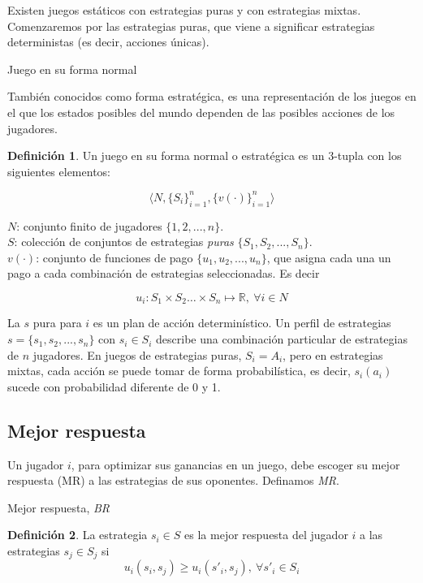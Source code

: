 \documentclass[12pt]{scrartcl}
\theoremstyle{definition}
\newtheorem{defi}{Definición}[section]
\begin{document}
Existen juegos estáticos con estrategias puras y con estrategias mixtas. Comenzaremos por las estrategias puras, que viene a significar estrategias deterministas (es decir, acciones únicas).

\begin{mybox}{Juego en su forma normal}

También conocidos como forma estratégica, es una representación de los juegos en el que los estados posibles del mundo dependen de las posibles acciones de los jugadores.

	\begin{defi}
		Un juego en su forma normal o estratégica es un 3-tupla con los siguientes elementos:
		
		\[ \big\langle N, \{S_i\}_{i=1}^n, \{v(\cdot)\}_{i=1}^n \big\rangle\]
		
		$N$: conjunto finito de jugadores $\{1, 2, ..., n\}$.\\
		$S$: colección de conjuntos de estrategias \textit{puras} $ \{S_1, S_2, ..., S_n\} $.\\
		$v(\cdot)$: conjunto de funciones de pago $ \{u_1, u_2,...,u_n\} $, que asigna cada una un pago a cada combinación de estrategias seleccionadas. Es decir
		
		\[ u_i\colon S_1 \times S_2 \dots \times S_n \mapsto \mathbb{R},\ \forall i \in N\]
			
	\end{defi}
\end{mybox}

La $s$ pura para $i$ es un plan de acción determinístico. Un perfil de estrategias $s=\{s_1, s_2, ..., s_n \}$ con $s_i \in S_i$ describe una combinación particular de estrategias de $n$ jugadores. En juegos de estrategias puras, $S_i = A_i$, pero en estrategias mixtas, cada acción se puede tomar de forma probabilística, es decir, $s_i(a_i)$ sucede con probabilidad diferente de 0 y 1.

\subsection{Mejor respuesta}

Un jugador $i$, para optimizar sus ganancias en un juego, debe escoger su mejor respuesta (MR) a las estrategias de sus oponentes. Definamos \textit{MR}.

\begin{mybox}{Mejor respuesta, \textit{BR}}
	\begin{defi}
		La estrategia $s_i \in S$ es la mejor respuesta del jugador $i$ a las estrategias $s_{j} \in S_{j}$ si
		\[ u_i(s_i, s_{j})\geq u_i(s'_i, s_{j}),\ \forall s'_i \in S_i \] 
	\end{defi}
\end{mybox}
\end{document}
